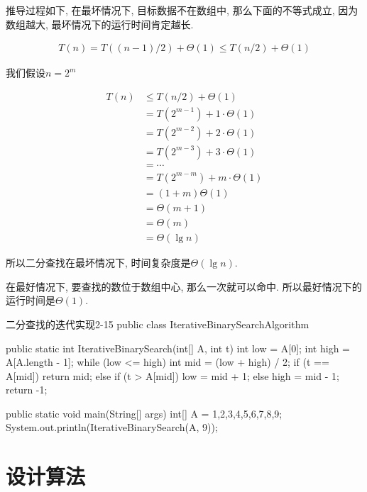 \documentclass[oneside,10pt,fontset=none]{ctexbook}
\numberwithin{definition}{chapter}
\numberwithin{theorem}{chapter}
\numberwithin{lemma}{chapter}
\begin{document}
推导过程如下, 在最坏情况下, 目标数据不在数组中, 那么下面的不等式成立, 因为数组越大, 最坏情况下的运行时间肯定越长.

\begin{equation*}\begin{split}
T(n) = T((n-1)/2)+\Theta(1) \leq T(n/2) + \Theta(1)
\end{split}\end{equation*}

我们假设$n=2^m$

\begin{equation*}\begin{split}
T(n) &\leq T(n/2) + \Theta(1) \\
     &= T(2^{m-1}) + 1\cdot\Theta(1) \\
     &= T(2^{m-2}) + 2\cdot\Theta(1) \\
     &= T(2^{m-3}) + 3\cdot\Theta(1) \\
     &= \cdots \\
     &= T(2^{m-m}) + m\cdot\Theta(1) \\
     &= (1+m)\Theta(1) \\
     &= \Theta(m+1) \\
     &= \Theta(m) \\
     &= \Theta(\lg{n})
\end{split}\end{equation*}

所以二分查找在最坏情况下, 时间复杂度是$\Theta(\lg{n})$.

在最好情况下, 要查找的数位于数组中心, 那么一次就可以命中. 所以最好情况下的运行时间是$\Theta(1)$.

\begin{myjava}{}{二分查找的迭代实现}{2-15}
public class IterativeBinarySearchAlgorithm {
    public static int IterativeBinarySearch(int[] A, int t) {
        int low = A[0];
        int high = A[A.length - 1];
        while (low <= high) {
            int mid = (low + high) / 2;
            if (t == A[mid])
                return mid;
            else if (t > A[mid])
                low = mid + 1;
            else
                high = mid - 1;
        }
        return -1;
    }

    public static void main(String[] args) {
        int[] A = {1,2,3,4,5,6,7,8,9};
        System.out.println(IterativeBinarySearch(A, 9));
    }
}
\end{myjava}

\section{设计算法}
\end{document}
